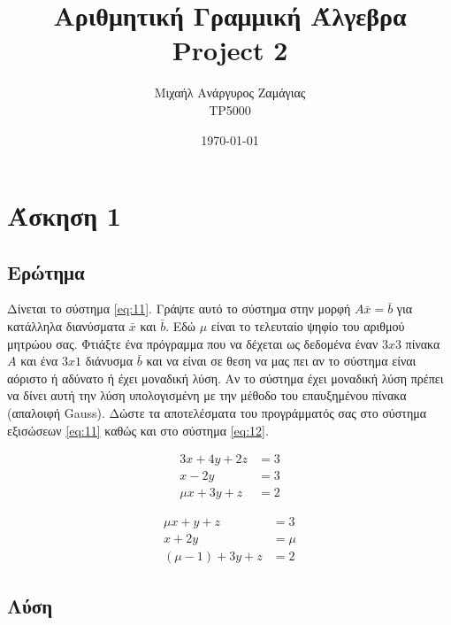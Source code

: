 \documentclass[12pt, fleqn, leqno]{extreport}
\begin{document}
\title{Αριθμητική Γραμμική Άλγεβρα\\Project 2}
\author{Μιχαήλ Ανάργυρος Ζαμάγιας\\TP5000}
\date{\today}
\maketitle
\newpage

\tableofcontents

\chapter{Άσκηση 1}
\section{Ερώτημα}

Δίνεται το σύστημα \eqref{eq:11}. Γράψτε αυτό το σύστημα στην μορφή $A\bar{x}=\bar{b}$ για κατάλληλα διανύσματα $\bar{x}$ και $\bar{b}$. Εδώ $\mu$ είναι το τελευταίο ψηφίο του αριθμού μητρώου σας. Φτιάξτε ένα πρόγραμμα που να δέχεται ως δεδομένα έναν $3x3$ πίνακα $A$ και ένα $3x1$ διάνυσμα $\bar{b}$ και να είναι σε θεση να μας πει αν το σύστημα είναι αόριστο ή αδύνατο ή έχει μοναδική λύση. Αν το σύστημα έχει μοναδική λύση πρέπει να δίνει αυτή την λύση υπολογισμένη με την μέθοδο του επαυξημένου πίνακα (απαλοιφή Gauss). Δώστε τα αποτελέσματα του προγράμματός σας στο σύστημα εξισώσεων \eqref{eq:11} καθώς και στο σύστημα \eqref{eq:12}.

\begin{equation}%
    \begin{aligned}
        3x      +   4y    + 2z & = 3 \\
        x       -   2y         & = 3 \\
        \mu x   +   3y    + z  & = 2
    \end{aligned}\label{eq:11}
\end{equation}

\begin{equation}%
    \begin{aligned}
        \mu x       +   y   + z & = 3   \\
        x           +   2y      & = \mu \\
        (\mu - 1)   +   3y  + z & = 2
    \end{aligned}\label{eq:12}
\end{equation}

\newpage
\section{Λύση}
\end{document}
